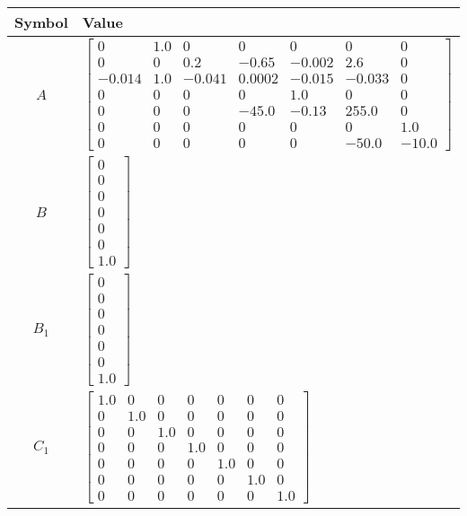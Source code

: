 \begin{tabular}{cl}
\hline
  Symbol  & Value                                                                                                                                                                                                                                                                                                  \\
\hline
   $A$    & $\left[\begin{matrix}0 & 1.0 & 0 & 0 & 0 & 0 & 0\\0 & 0 & 0.2 & -0.65 & -0.002 & 2.6 & 0\\-0.014 & 1.0 & -0.041 & 0.0002 & -0.015 & -0.033 & 0\\0 & 0 & 0 & 0 & 1.0 & 0 & 0\\0 & 0 & 0 & -45.0 & -0.13 & 255.0 & 0\\0 & 0 & 0 & 0 & 0 & 0 & 1.0\\0 & 0 & 0 & 0 & 0 & -50.0 & -10.0\end{matrix}\right]$ \\
   $B$    & $\left[\begin{matrix}0\\0\\0\\0\\0\\0\\1.0\end{matrix}\right]$                                                                                                                                                                                                                                         \\
 $B_{1}$  & $\left[\begin{matrix}0\\0\\0\\0\\0\\0\\1.0\end{matrix}\right]$                                                                                                                                                                                                                                         \\
 $C_{1}$  & $\left[\begin{matrix}1.0 & 0 & 0 & 0 & 0 & 0 & 0\\0 & 1.0 & 0 & 0 & 0 & 0 & 0\\0 & 0 & 1.0 & 0 & 0 & 0 & 0\\0 & 0 & 0 & 1.0 & 0 & 0 & 0\\0 & 0 & 0 & 0 & 1.0 & 0 & 0\\0 & 0 & 0 & 0 & 0 & 1.0 & 0\\0 & 0 & 0 & 0 & 0 & 0 & 1.0\end{matrix}\right]$                                                     \\

\end{tabular}
